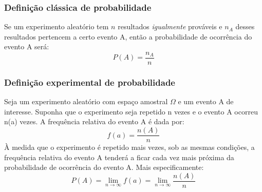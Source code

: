 \documentclass[10pt]{article}
\begin{document}
\subsubsection{Definição clássica de probabilidade}
\par Se um experimento aleatório tem \begin{math}n\end{math} resultados \textit{igualmente}
    prováveis e \begin{math}n_A\end{math} desses resultados pertencem a certo evento A, então
    a probabilidade de ocorrência do evento A será:
    \begin{displaymath}
        P(A) = \frac{n_A}{n}
    \end{displaymath}
\subsubsection{Definição experimental de probabilidade}
\par Seja um experimento aleatório com espaço amostral \begin{math}\Omega\end{math} e um 
    evento A de interesse. Suponha que o experimento seja repetido n vezes e o evento A
    ocorreu n(a) vezes. A frequência relativa do evento A é dada por:
    \begin{displaymath}
        f(a) = \frac{n(A)}{n}
    \end{displaymath}
    À medida que o experimento é repetido mais vezes, sob as mesmas condições,
    a frequência relativa do evento A tenderá a ficar cada vez mais próxima
    da probabilidade de ocorrência do evento A. Mais especificamente:
    \begin{displaymath}
        P(A) = \lim_{n \to \infty} f(a) = \lim_{n \to \infty} \frac{n(A)}{n}
    \end{displaymath}
\end{document}
